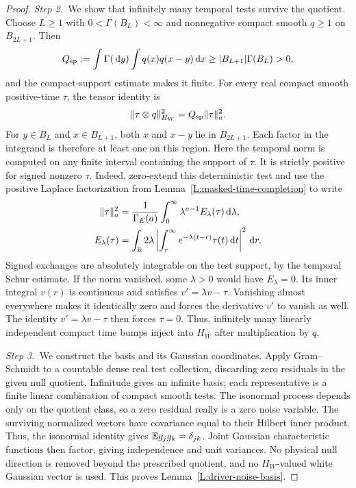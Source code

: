 \begin{proof}
  \medskip
  \noindent\textit{Step 2.~}We show that infinitely many temporal tests
  survive the quotient.
  Choose $L \ge 1$ with $0 < \Gamma(B_L) < \infty$ and nonnegative compact
  smooth $q \ge 1$ on $B_{2L+1}$. Then
  \[
    Q_{\rm sp}:=\int\Gamma(\,\mathrm{d} y)\int q(x)q(x-y)\,\mathrm{d} x
    \ge |B_{L+1}|\Gamma(B_L)>0,
  \]
  and the compact-support estimate makes it finite. For every real compact
  smooth positive-time $\tau$, the tensor identity is
  \[
    \|\tau\otimes q\|_{H_W}^2=Q_{\rm sp}\|\tau\|_a^2.
  \]
  For $y \in B_L$ and $x \in B_{L+1}$, both $x$ and $x-y$ lie in $B_{2L+1}$.
  Each factor in the integrand is therefore at least one on this region.
  Here the temporal norm is computed on any finite interval containing the
  support of $\tau$. It is strictly positive for signed nonzero $\tau$. Indeed,
  zero-extend this deterministic test and use the positive Laplace factorization
  from Lemma~\ref{L:masked-time-completion} to write
  \begin{align*}
    \|\tau\|_a^2
    &=\frac1{\Gamma_E(a)}\int_0^\infty\lambda^{a-1}
    E_\lambda(\tau)\,\mathrm{d}\lambda,\\
    E_\lambda(\tau)
    &=\int_{\mathbb{R}} 2\lambda\left|\int_r^\infty
    e^{-\lambda(t-r)}\tau(t)\,\mathrm{d} t\right|^2\,\mathrm{d} r.
  \end{align*}
  Signed exchanges are absolutely integrable on the test support, by the
  temporal Schur estimate. If the norm vanished, some $\lambda > 0$ would have
  $E_\lambda = 0$. Its inner integral $v(r)$ is continuous and satisfies $v' =
  \lambda v-\tau$. Vanishing almost everywhere makes it identically zero and
  forces the derivative $v'$ to vanish as well. The identity $v' = \lambda
  v-\tau$ then
  forces $\tau = 0$. Thus, infinitely many linearly independent compact time
  bumps inject into $H_W$ after multiplication by $q$.

  \medskip
  \noindent\textit{Step 3.~}We construct the basis and its Gaussian
  coordinates.
  Apply Gram--Schmidt to a countable dense real test collection, discarding zero
  residuals in the given null quotient. Infinitude gives an infinite basis; each
  representative is a finite linear combination of compact smooth tests. The
  isonormal process depends only on the quotient class, so a zero residual
  really is a zero noise variable. The surviving normalized vectors have
  covariance equal to their Hilbert inner product. Thus, the
  isonormal identity gives $\mathbb{E} g_jg_k = \delta_{jk}$. Joint Gaussian
  characteristic functions then factor, giving independence and unit variances.
  No physical null direction is removed beyond the prescribed quotient, and no
  $H_W$-valued white Gaussian vector is used. This proves
  Lemma~\ref{L:driver-noise-basis}.
\end{proof}

